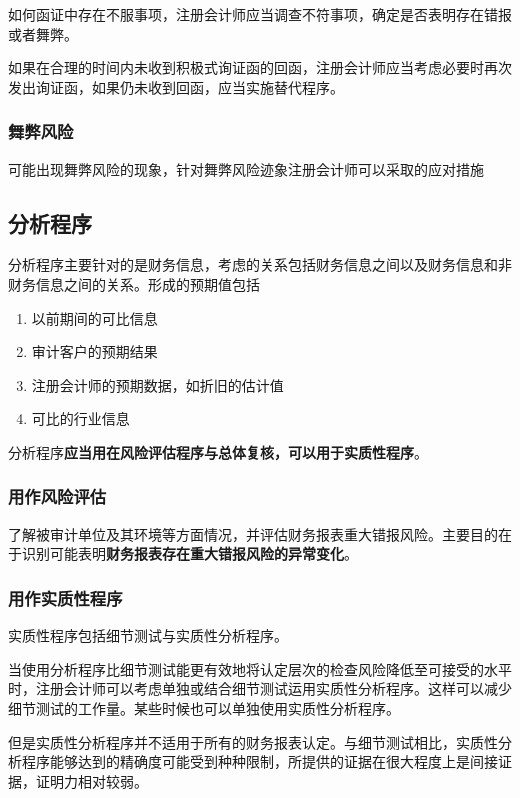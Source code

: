 \documentclass[UTF8,12pt]{ctexart}
\numberwithin{equation}{section} %
\numberwithin{figure}{section}
\numberwithin{table}{section}
\begin{document}
	如何函证中存在不服事项，注册会计师应当调查不符事项，确定是否表明存在错报或者舞弊。
	
	如果在合理的时间内未收到积极式询证函的回函，注册会计师应当考虑必要时再次发出询证函，如果仍未收到回函，应当实施替代程序。
	
	\subsubsection{舞弊风险}
	
	可能出现舞弊风险的现象，针对舞弊风险迹象注册会计师可以采取的应对措施
	
	\subsection{分析程序}
	分析程序主要针对的是财务信息，考虑的关系包括财务信息之间以及财务信息和非财务信息之间的关系。形成的预期值包括
	\begin{enumerate}
		\item 以前期间的可比信息
		
		\item 审计客户的预期结果
		
		\item 注册会计师的预期数据，如折旧的估计值
		
		\item 可比的行业信息
	\end{enumerate}
	
	分析程序\textbf{应当用在风险评估程序与总体复核，可以用于实质性程序}。
	
	\subsubsection{用作风险评估}
	了解被审计单位及其环境等方面情况，并评估财务报表重大错报风险。主要目的在于识别可能表明\textbf{财务报表存在重大错报风险的异常变化}。
	
	\subsubsection{用作实质性程序}
	实质性程序包括细节测试与实质性分析程序。
	
	当使用分析程序比细节测试能更有效地将认定层次的检查风险降低至可接受的水平时，注册会计师可以考虑单独或结合细节测试运用实质性分析程序。这样可以减少细节测试的工作量。某些时候也可以单独使用实质性分析程序。
	
	但是实质性分析程序并不适用于所有的财务报表认定。与细节测试相比，实质性分析程序能够达到的精确度可能受到种种限制，所提供的证据在很大程度上是间接证据，证明力相对较弱。
	
\end{document}
